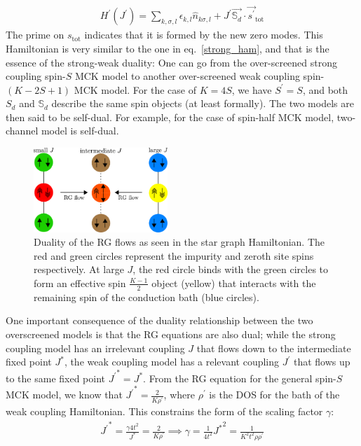 \documentclass[reprint,prb,superscriptaddress]{revtex4-2}
\begin{document}
\begin{equation}\begin{aligned}
	H^\prime(J^\prime) = \sum_{k,\sigma,l}\epsilon_{k,l} \hat n_{k\sigma,l} + J^\prime \vec{\mathbb{S}_d}\cdot\vec{s^\prime}_\text{tot}
\end{aligned}\end{equation}
The prime on \(s_\text{tot}\) indicates that it is formed by the new zero modes. This Hamiltonian is very similar to the one in eq.~\ref{strong_ham}, and that is the essence of the strong-weak duality: One can go from the over-screened strong coupling spin-\(S\) MCK model to another over-screened weak coupling spin-\((K-2S+1)\) MCK model. For the case of \(K=4S\), we have \(S^\prime = S\), and both \(S_d\) and \(\mathbb{S}_d\) describe the same spin objects (at least formally). The two models are then said to be self-dual. For example, for the case of spin-half MCK model, two-channel model is self-dual.
\begin{figure}[!htpb]
	\centering
	\includegraphics[width=0.45\textwidth]{./duality.pdf}
	\caption{Duality of the RG flows as seen in the star graph Hamiltonian. The red and green circles represent the impurity and zeroth site spins respectively. At large \(J\), the red circle binds with the green circles to form an effective spin \(\frac{K-1}{2}\) object (yellow) that interacts with the remaining spin of the conduction bath (blue circles).}
	\label{duality_fig}
\end{figure}

One important consequence of the duality relationship between the two overscreened models is that the RG equations are also dual; while the strong coupling model has an irrelevant coupling \(J\) that flows down to the intermediate fixed point \(J^*\), the weak coupling model has a relevant coupling \(J^\prime\) that flows up to the same fixed point \({J^\prime}^* = J^*\). From the RG equation for the general spin-\(S\) MCK model, we know that \({J^\prime}^* = \frac{2}{K \rho^\prime}\), where \(\rho^\prime\) is the DOS for the bath of the weak coupling Hamiltonian. This constrains the form of the scaling factor \(\gamma\):
\begin{equation}\begin{aligned}
	{J^\prime}^* = \frac{\gamma 4t^2}{J^*} = \frac{2}{K \rho^\prime} \implies \gamma = \frac{1}{4t^2} {J^*}^2 = \frac{1}{K^2 t^2 \rho \rho^\prime}
\end{aligned}\end{equation}
\end{document}
